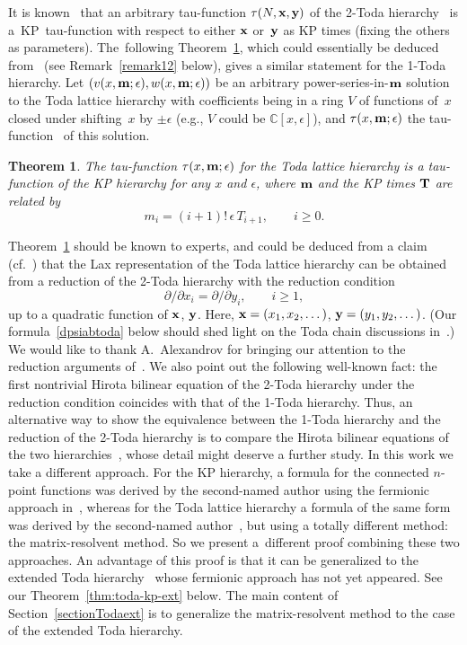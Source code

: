 \documentclass[pdftex]{sigma}
\newcommand{\e}{\epsilon}
\newcommand{\p}{\partial}
\newcommand{\be}{\begin{equation}}
\newcommand{\ee}{\end{equation}}
\numberwithin{equation}{section}
\newtheorem{Theorem}{Theorem}[section]
\begin{document}
It is known~\cite{UT} that an arbitrary tau-function $\tau(N,{\bf x},{\bf y})$ of the 2-Toda hierarchy~\cite{UT}
is a~KP~tau-function with respect to either ${\bf x}$ or~${\bf y}$ as KP times (fixing the others
as parameters). The~following Theorem~\ref{thm:toda-kp},
which could essentially be deduced from~\cite{UT} (see Remark~\ref{remark12} below), gives a similar statement for the 1-Toda hierarchy. Let $(v(x,{\bf m};\e), w(x,{\bf m};\e))$ be an arbitrary power-series-in-${\bf m}$ solution
to the Toda lattice hierarchy
with coefficients being in a ring $V$ of functions of~$x$ closed under shifting~$x$
by $\pm \e$ (e.g., $V$ could be $\mathbb{C}[x,\e]$),
and $\tau(x,{\bf m};\e)$ the tau-function~\cite{DY} of this solution.
\begin{Theorem} \label{thm:toda-kp}
The tau-function $\tau(x,{\bf m};\e)$ for the Toda lattice hierarchy
is a tau-function of the KP hierarchy for any $x$ and $\e$,
where ${\bf m}$ and the KP times ${\bf T}$ are related by
\be\label{tT30}
m_i = (i+1)! \, \e \, T_{i+1},\qquad i\ge0.
\ee
\end{Theorem}
\begin{Remark}\label{remark12}
Theorem~\ref{thm:toda-kp} should be known to experts, and could be deduced
from a claim~\cite[p.~30]{UT} (cf.\ \cite{KMMM}) that the Lax representation of the
Toda lattice hierarchy can be obtained from
a reduction of the 2-Toda hierarchy with
the reduction condition
\[
\p/\p x_i = \p /\p y_i, \qquad i\ge1,
\]
up to a quadratic function
of ${\bf x}$, ${\bf y}$. Here, ${\bf x}=(x_1,x_2,\dots)$, ${\bf y}=(y_1,y_2,\dots)$.
(Our formula~\eqref{dpsiabtoda} below should shed light on the Toda chain discussions in~\cite{KMMM}.)
We would like to thank A.~Alexandrov for bringing our attention to the reduction arguments of~\cite{UT}.
We also point out the following well-known fact: the first nontrivial Hirota bilinear equation
of the 2-Toda hierarchy under the reduction condition coincides with that of the 1-Toda hierarchy. Thus, an alternative way to
show the equivalence between the 1-Toda hierarchy and the reduction of the 2-Toda hierarchy is
to compare the Hirota bilinear equations of the two hierarchies~\cite{Milanov, UT}, whose detail might deserve
a further study.
In this work we take a different approach. For the KP hierarchy,
a formula for the connected $n$-point functions was derived by the second-named author using the fermionic approach in~\cite{Zhou-Emergent},
whereas for the Toda lattice hierarchy a formula of the same form was derived by the second-named author~\cite{Y}, but using a totally different method:
the matrix-resolvent method. So we present a~different proof combining these two approaches. An advantage of this proof is that it can be generalized
to the extended Toda hierarchy~\cite{CDZ} whose fermionic approach has not yet appeared. See our Theorem~\ref{thm:toda-kp-ext} below. The main content of Section~\ref{sectionTodaext}
is to generalize the matrix-resolvent method to the case of the extended Toda hierarchy.
\end{Remark}
\end{document}
